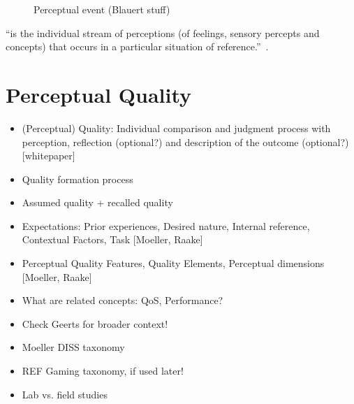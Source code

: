 \begin{figure}
	\caption{Perceptual event (Blauert stuff)}
	\label{img:chap02:auditory-event}
\end{figure}






\begin{definition}[Experiencing]
``is the individual stream of perceptions (of feelings, sensory percepts and concepts) that occurs in a particular situation of reference.''~\citep[p. 13]{moller_quality_2014}.
\end{definition}

\section{Perceptual Quality}
\begin{itemize}
\item (Perceptual) Quality: Individual comparison and judgment process with perception, reflection (optional?) and description of the outcome (optional?) [whitepaper]
\item Quality formation process
\item Assumed quality + recalled quality
\item Expectations: Prior experiences, Desired nature, Internal reference, Contextual Factors, Task [Moeller, Raake] 
\item Perceptual Quality Features, Quality Elements, Perceptual dimensions [Moeller, Raake]%
\item What are related concepts: QoS, Performance?
\item Check Geerts for broader context!
\item Moeller DISS taxonomy
\item REF Gaming taxonomy, if used later!
\item Lab vs. field studies
\end{itemize}

